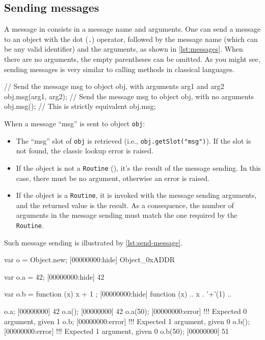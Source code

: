 \subsection{Sending messages}

A message in \us consists in a message name and arguments. One can
send a message to an object with the dot (\lstinline|.|) operator,
followed by the message name (which can be any valid identifier) and
the arguments, as shown in \autoref{lst:messages}. When there are no
arguments, the empty parentheses can be omitted. As you might see,
sending messages is very similar to calling methods in classical
languages.

\begin{urbiscript}[caption=Sending messages, label=lst:messages,
  float=\floatpos]
// Send the message msg to object obj, with arguments arg1 and arg2
obj.msg(arg1, arg2);
// Send the message msg to object obj, with no arguments
obj.msg();
// This is strictly equivalent
obj.msg;
\end{urbiscript}

When a message ``msg'' is sent to object \lstinline|obj|:

\begin{itemize}
\item The ``msg'' slot of \lstinline|obj| is retrieved (i.e.,
  \lstinline|obj.getSlot("msg")|). If the slot is not found, the
  classic lookup error is raised.
\item If the object is not a \lstinline|Routine| (), it's
  the result of the message sending. In this case, there must be no
  argument, otherwise an error is raised.
\item If the object is a \lstinline|Routine|, it is invoked with the
  message sending arguments, and the returned value is the result. As
  a consequence, the number of arguments in the message sending must
  match the one required by the \lstinline|Routine|.
\end{itemize}

Such message sending is illustrated by \autoref{lst:send-message}.

\begin{urbiscript}[caption=Sending messages, label=lst:send-message,
  float=\floatpos]
var o = Object.new;
[00000000:hide] Object_0xADDR

var o.a = 42;
[00000000:hide] 42

var o.b = function (x) { x + 1 };
[00000000:hide] function (x) {
..  x . '+'(1)
..}

o.a;
[00000000] 42
o.a();
[00000000] 42
o.a(50);
[00000000:error] !!! Expected 0 argument, given 1
o.b;
[00000000:error] !!! Expected 1 argument, given 0
o.b();
[00000000:error] !!! Expected 1 argument, given 0
o.b(50);
[00000000] 51
\end{urbiscript}


